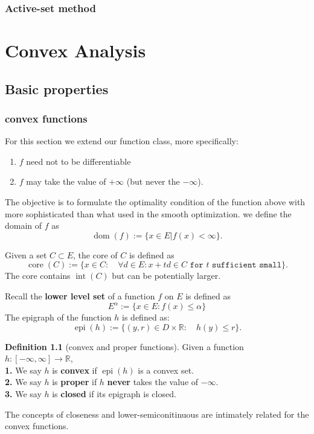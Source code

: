 \documentclass[a4paper,11pt,fleqn, draft]{book}
\theoremstyle{definition}
\newtheorem{definition}{Definition}[section]
\theoremstyle{remark}
\DeclareMathOperator{\dom}{dom}
\DeclareMathOperator*{\interior}{int}
\DeclareMathOperator*{\epi}{epi}
\DeclareMathOperator*{\core}{core}
\begin{document}
\subsection{Active-set method}



\chapter{Convex Analysis}
\section{Basic properties}
\subsection{convex functions}
For this section we extend our function class, more specifically:
\begin{enumerate}
	\item $f$ need not to be differentiable
	\item $f$ may take the value of $+ \infty$ (but never the $-\infty$). 
\end{enumerate}

The objective is to formulate the optimality condition of the function above with more sophisticated than what used in the smooth optimization. we define the domain of $f$ as
	\begin{equation}
		\dom(f):= \{ x\in E| f(x) < \infty \}. 
	\end{equation}
    
Given a set $C \subset E$, the core of $C$ is defined as
\begin{equation}
	\core(C):= \{ x \in C: \quad \forall d \in E: x + td \in C \texttt{ for $t$ sufficient small} \}. 
\end{equation}
The core contains $\interior(C)$ but can be potentially larger.\par

Recall the \textbf{lower level set} of a function $f$ on $E$ is defined as 
$$
E^\alpha := \{ x \in E: f(x) \le \alpha \}
$$ 
The epigraph of the function $h$ is defined as:
\begin{equation}
	\epi(h):= \{(y, r) \in D \times \mathbb{R}: \quad h(y) \le r \}.
\end{equation}

\begin{definition}[convex and proper functions]
Given a function $h:[-\infty, \infty] \rightarrow \mathbb{R}$,\\
\textbf{1. }We say $h$ is \textbf{convex} if $\epi(h)$ is a convex set. \\
\textbf{2. }We say $h$ is \textbf{proper} if $h$ \textbf{never} takes the value of $-\infty$. \\
\textbf{3. }We say $h$ is \textbf{closed} if its epigraph is closed.
\end{definition}
The concepts of closeness and lower-semiconitinuous are intimately related for the convex functions. 
\end{document}
